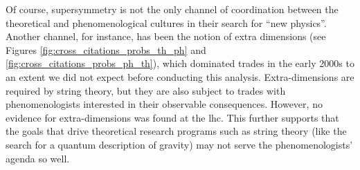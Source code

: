 \documentclass[smallextended]{svjour3}
\begin{document}
Of course, supersymmetry is not the only channel of coordination between the theoretical and phenomenological cultures in their search for ``new physics''. Another channel, for instance, has been the notion of extra dimensions (see Figures \ref{fig:cross_citations_probs_th_ph} and \ref{fig:cross_citations_probs_ph_th}), which dominated trades in the early 2000s to an extent we did not expect before conducting this analysis. Extra-dimensions are required by string theory, but they are also subject to trades with phenomenologists interested in their observable consequences. However, no evidence for extra-dimensions was found at the \gls{lhc}. This further supports that the goals that drive theoretical research programs such as string theory (like the search for a quantum description of gravity) may not serve the phenomenologists' agenda so well.
\end{document}
